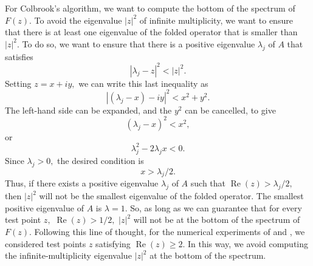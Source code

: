 For Colbrook's algorithm, we want to compute the bottom of the spectrum of $F(z).$ To avoid the eigenvalue $|z|^2$ of infinite multiplicity, we want to ensure that there is at least one eigenvalue of the folded operator that is smaller than $|z|^2.$ To do so, we want to ensure that there is a positive eigenvalue $\lambda_j$ of $A$ that satisfies
\begin{equation}
    | \lambda_j - z |^2 < |z|^2.
\end{equation}
Setting $z = x+iy,$ we can write this last inequality as 
\begin{equation}
    | (\lambda_j-x) - iy |^2 < x^2 + y^2.
\end{equation}
The left-hand side can be expanded, and the $y^2$ can be cancelled, to give
\begin{equation}
    (\lambda_j - x)^2 < x^2, 
\end{equation}
or
\begin{equation}
    \lambda_j^2 - 2 \lambda_j x   < 0.
\end{equation}
Since $\lambda_j > 0,$ the desired condition is
\begin{equation}
    x > \lambda_j / 2.
\end{equation}
Thus, if there exists a positive eigenvalue $\lambda_j$ of $A$ such that $\operatorname{Re}(z) > \lambda_j / 2,$ then $|z|^2$ will not be the smallest eigenvalue of the folded operator. The smallest positive eigenvalue of $A$ is $\lambda = 1.$ So, as long as we can guarantee that for every test point $z,$ $\operatorname{Re}(z) > 1/2,$ $|z|^2$ will not be at the bottom of the spectrum of $F(z).$ Following this line of thought, for the numerical experiments of  and , we considered test points $z$ satisfying $\operatorname{Re}(z) \ge 2.$ In this way, we avoid computing the infinite-multiplicity eigenvalue $|z|^2$ at the bottom of the spectrum. 